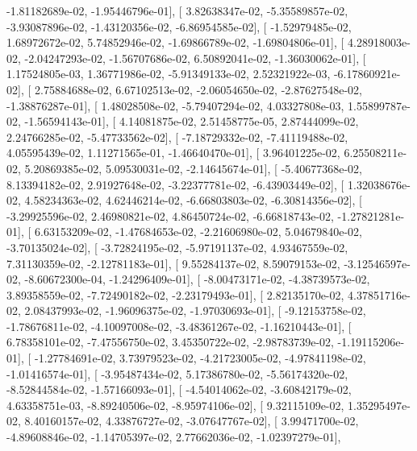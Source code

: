 \documentclass{article}
\begin{document}
         -1.81182689e-02,  -1.95446796e-01],
       [  3.82638347e-02,  -5.35589857e-02,  -3.93087896e-02,
         -1.43120356e-02,  -6.86954585e-02],
       [ -1.52979485e-02,   1.68972672e-02,   5.74852946e-02,
         -1.69866789e-02,  -1.69804806e-01],
       [  4.28918003e-02,  -2.04247293e-02,  -1.56707686e-02,
          6.50892041e-02,  -1.36030062e-01],
       [  1.17524805e-03,   1.36771986e-02,  -5.91349133e-02,
          2.52321922e-03,  -6.17860921e-02],
       [  2.75884688e-02,   6.67102513e-02,  -2.06054650e-02,
         -2.87627548e-02,  -1.38876287e-01],
       [  1.48028508e-02,  -5.79407294e-02,   4.03327808e-03,
          1.55899787e-02,  -1.56594143e-01],
       [  4.14081875e-02,   2.51458775e-05,   2.87444099e-02,
          2.24766285e-02,  -5.47733562e-02],
       [ -7.18729332e-02,  -7.41119488e-02,   4.05595439e-02,
          1.11271565e-01,  -1.46640470e-01],
       [  3.96401225e-02,   6.25508211e-02,   5.20869385e-02,
          5.09530031e-02,  -2.14645674e-01],
       [ -5.40677368e-02,   8.13394182e-02,   2.91927648e-02,
         -3.22377781e-02,  -6.43903449e-02],
       [  1.32038676e-02,   4.58234363e-02,   4.62446214e-02,
         -6.66803803e-02,  -6.30814356e-02],
       [ -3.29925596e-02,   2.46980821e-02,   4.86450724e-02,
         -6.66818743e-02,  -1.27821281e-01],
       [  6.63153209e-02,  -1.47684653e-02,  -2.21606980e-02,
          5.04679840e-02,  -3.70135024e-02],
       [ -3.72824195e-02,  -5.97191137e-02,   4.93467559e-02,
          7.31130359e-02,  -2.12781183e-01],
       [  9.55284137e-02,   8.59079153e-02,  -3.12546597e-02,
         -8.60672300e-04,  -1.24296409e-01],
       [ -8.00473171e-02,  -4.38739573e-02,   3.89358559e-02,
         -7.72490182e-02,  -2.23179493e-01],
       [  2.82135170e-02,   4.37851716e-02,   2.08437993e-02,
         -1.96096375e-02,  -1.97030693e-01],
       [ -9.12153758e-02,  -1.78676811e-02,  -4.10097008e-02,
         -3.48361267e-02,  -1.16210443e-01],
       [  6.78358101e-02,  -7.47556750e-02,   3.45350722e-02,
         -2.98783739e-02,  -1.19115206e-01],
       [ -1.27784691e-02,   3.73979523e-02,  -4.21723005e-02,
         -4.97841198e-02,  -1.01416574e-01],
       [ -3.95487434e-02,   5.17386780e-02,  -5.56174320e-02,
         -8.52844584e-02,  -1.57166093e-01],
       [ -4.54014062e-02,  -3.60842179e-02,   4.63358751e-03,
         -8.89240506e-02,  -8.95974106e-02],
       [  9.32115109e-02,   1.35295497e-02,   8.40160157e-02,
          4.33876727e-02,  -3.07647767e-02],
       [  3.99471700e-02,  -4.89608846e-02,  -1.14705397e-02,
          2.77662036e-02,  -1.02397279e-01],
\end{document}
